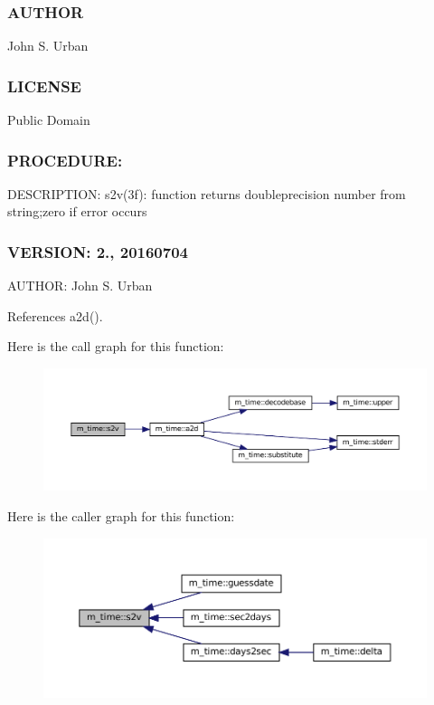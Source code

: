 \subsubsection*{A\+U\+T\+H\+OR}

John S. Urban \subsubsection*{L\+I\+C\+E\+N\+SE}

Public Domain \subsubsection*{P\+R\+O\+C\+E\+D\+U\+RE\+:}

D\+E\+S\+C\+R\+I\+P\+T\+I\+ON\+: s2v(3f)\+: function returns doubleprecision number from string;zero if error occurs \subsubsection*{V\+E\+R\+S\+I\+ON\+: 2., 20160704}

A\+U\+T\+H\+OR\+: John S. Urban 

References a2d().

Here is the call graph for this function\+:\nopagebreak
\begin{figure}[H]
\begin{center}
\leavevmode
\includegraphics[width=350pt]{namespacem__time_a30c2f29f22d676ade9dff5ad6c35aae5_cgraph}
\end{center}
\end{figure}
Here is the caller graph for this function\+:\nopagebreak
\begin{figure}[H]
\begin{center}
\leavevmode
\includegraphics[width=350pt]{namespacem__time_a30c2f29f22d676ade9dff5ad6c35aae5_icgraph}
\end{center}
\end{figure}
\mbox{\label{namespacem__time_a7788285d79b8d58323b05e9a30a2d992}} 
